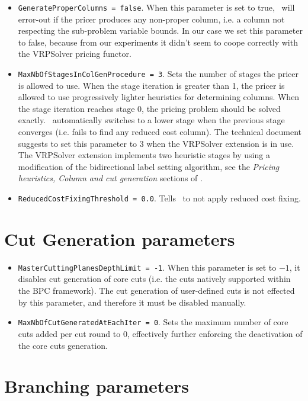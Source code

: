 \begin{itemize}
	\item \texttt{GenerateProperColumns = false}.
	      When this parameter is set to true, \bapcod\ will error-out if the pricer produces any non-proper column,
	      i.e. a column not respecting the sub-problem variable bounds.
	      In our case we set this parameter to false, because from our experiments it didn't seem to coope correctly with the VRPSolver pricing functor.
	\item \texttt{MaxNbOfStagesInColGenProcedure = 3}.
	      Sets the number of stages the pricer is allowed to use.
	      When the stage iteration is greater than 1, the pricer is allowed to use
	      progressively lighter heuristics for determining columns.
	      When the stage iteration reaches stage 0, the pricing problem should be solved exactly.
	      \bapcod\ automatically switches to a lower stage when the previous stage converges (i.e. fails to find any reduced cost column).
	      The technical document suggests to set this parameter to $3$ when the VRPSolver extension is in use.
	      The VRPSolver extension implements two heuristic stages by using a modification of the bidirectional label setting algorithm, see the \textit{Pricing heuristics, Column and cut generation} sections of \textcite{sadykov2021a}.
	\item \texttt{ReducedCostFixingThreshold = 0.0}.
	      Tells \bapcod\ to not apply reduced cost fixing.
\end{itemize}

\section{Cut Generation parameters}
\begin{itemize}
	\item \texttt{MasterCuttingPlanesDepthLimit = -1}.
	      When this parameter is set to $-1$, it disables cut generation of core cuts
	      (i.e. the cuts natively supported within the BPC framework).
	      The cut generation of user-defined cuts
	      is not effected by this parameter, and therefore it must be disabled manually.
	\item \texttt{MaxNbOfCutGeneratedAtEachIter = 0}.
	      Sets the maximum number of core cuts added per cut round to $0$,
	      effectively further enforcing the deactivation of the core cuts generation.
\end{itemize}

\section{Branching parameters}

